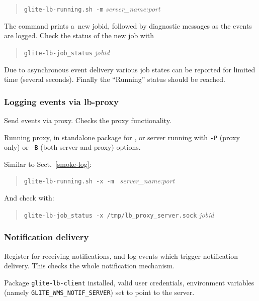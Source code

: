 \how
\begin{quote}
\texttt{glite-lb-running.sh -m} \emph{server\_name:port}
\end{quote}

The command prints a~new jobid, followed by diagnostic messages as the events are logged. 
Check the status of the new job with
\begin{quote}
\verb'glite-lb-job_status' \emph{jobid}
\end{quote}

\result
Due to asynchronous event
delivery various job states can be reported for limited time (several seconds).
Finally the
``Running'' status should be reached.

\subsubsection{Logging events via lb-proxy}

Send events via \LB proxy. Checks the proxy functionality.

\req Running \LB proxy, in standalone package for , or
\LB server running with \verb'-P' (proxy only) or \verb'-B' (both server and proxy)
options.\footnotemark[\theexamplesfootnote]

\how Similar to Sect.~\ref{smoke-log}:
\begin{quote}
\verb'glite-lb-running.sh -x -m ' \emph{server\_name:port}
\end{quote}

And check with:
\begin{quote}
\verb'glite-lb-job_status -x /tmp/lb_proxy_server.sock' \emph{jobid}
\end{quote}


\subsubsection{Notification delivery}

Register for receiving notifications, and log events which trigger
notification delivery. This checks the whole notification mechanism.

\req Package \texttt{glite-lb-client} installed, valid user credentials, environment variables (namely \texttt{GLITE\_WMS\_NOTIF\_SERVER}) set to point to the \LB server.

